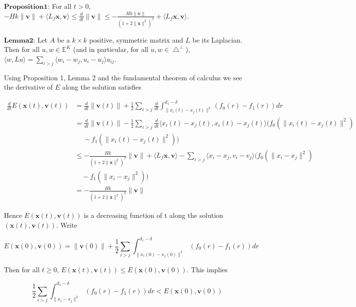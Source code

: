 $\mathbf{Proposition 1}$: For all $t>0$, $-Hk\|\mathbf{v}\|+\langle L_f\mathbf{x}, \mathbf{v}\rangle\leq\frac{d}{dt}\|\mathbf{v}\|\leq-\frac{Hk\|\mathbf{v}\|}{(1+2\|\mathbf{x}\|^2)^{\beta}}+\langle L_f\mathbf{x}, \mathbf{v}\rangle$.

$\mathbf{Lemma 2}$: Let $A$ be a $k\times k$ positive, symmetric matrix and $L$ be its Laplacian. Then for all $u, w\in\mathbb{E}^K$ (and in particular, for all $u, w\in\bigtriangleup^{\perp}$), $\langle w, Lu\rangle=\sum_{i>j}\langle w_i-w_j, u_i-u_j\rangle a_{ij}$.

\noindent
Using Proposition 1, Lemma 2 and the fundamental theorem of calculus we see the derivative of $E$ along the solution satisfies

\begin{equation}\label{eq:dExv}
\begin{aligned}
\frac{d}{dt}E(\mathbf{x}(t), \mathbf{v}(t))&=\frac{d}{dt}\|\mathbf{v}(t)\|+\frac{1}{2}\sum_{i>j}\frac{d}{dt}\int_{\|x_i(t)-x_j(t)\|^2}^{d_1-\delta}(f_0(r)-f_1(r))dr\\
&=\frac{d}{dt}\|\mathbf{v}(t)\|-\frac{1}{2}\sum_{i>j}\frac{d}{dt}\langle x_i(t)-x_j(t),x_i(t)-x_j(t)\rangle(f_0(\|x_i(t)-x_j(t)\|^2)\\
&\quad\ -f_1(\|x_i(t)-x_j(t)\|^2))\\
&\leq-\frac{Hk}{(1+2\|\mathbf{x}\|^2)^{\beta}}\|\mathbf{v}\|+\langle L_f\mathbf{x}, \mathbf{v}\rangle-\sum_{i>j}\langle x_i-x_j, v_i-v_j\rangle(f_0(\|x_i-x_j\|^2)\\
&\quad-f_1(\|x_i-x_j\|^2))\\
&=-\frac{Hk}{(1+2\|\mathbf{x}\|^2)^{\beta}}\|\mathbf{v}\|
\end{aligned}
\end{equation}

\noindent
Hence $E(\mathbf{x}(t), \mathbf{v}(t))$ is a decreasing function of t along the solution $(\mathbf{x}(t), \mathbf{v}(t))$. Write

\begin{equation}\label{eq:E0}
E(\mathbf{x}(0), \mathbf{v}(0))=\|\mathbf{v}(0)\|+\frac{1}{2}\sum_{i>j}\int_{\|x_i(0)-x_j(0)\|^2}^{d_1-\delta}(f_0(r)-f_1(r))dr
\end{equation}

\noindent
Then for all $t\geq0$, $E(\mathbf{x}(t), \mathbf{v}(t))\leq E(\mathbf{x}(0), \mathbf{v}(0))$. This implies

\begin{equation}
\frac{1}{2}\sum_{i>j}\int_{\|x_i-x_j\|^2}^{d_1-\delta}(f_0(r)-f_1(r))dr<E(\mathbf{x}(0), \mathbf{v}(0))
\end{equation}

